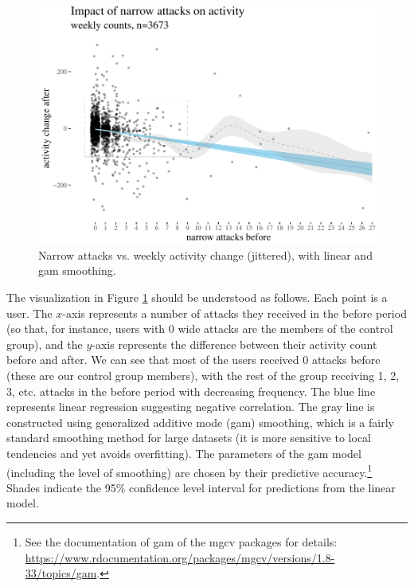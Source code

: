 \documentclass[
  10pt,
  dvipsnames]{scrartcl}
\begin{document}
\footnotesize

\normalsize

\begin{figure}

\begin{center}\includegraphics[width=0.85\linewidth]{testPatrycja_files/figure-latex/unnamed-chunk-3-1} \end{center}
\caption{Narrow attacks vs. weekly activity change (jittered), with  linear and gam smoothing.}
\label{fig:highPlots}
\end{figure}

The visualization in Figure \ref{fig:highPlots} should be understood as
follows. Each point is a user. The \(x\)-axis represents a number of
attacks they received in the \textsf{before} period (so that, for
instance, users with 0 wide attacks are the members of the control
group), and the \(y\)-axis represents the difference between their
activity count \textsf{before} and \textsf{after}. We can see that most
of the users received 0 attacks before (these are our control group
members), with the rest of the group receiving 1, 2, 3, etc. attacks in
the \textsf{before} period with decreasing frequency. The blue line
represents linear regression suggesting negative correlation. The gray
line is constructed using generalized additive mode (gam) smoothing,
which is a fairly standard smoothing method for large datasets (it is
more sensitive to local tendencies and yet avoids overfitting). The
parameters of the gam model (including the level of smoothing) are
chosen by their predictive
accuracy.\footnote{See  the documentation of \textsf{gam} of the \textsf{mgcv} packages for details: \url{https://www.rdocumentation.org/packages/mgcv/versions/1.8-33/topics/gam}.}
Shades indicate the 95\% confidence level interval for predictions from
the linear model.
\end{document}
